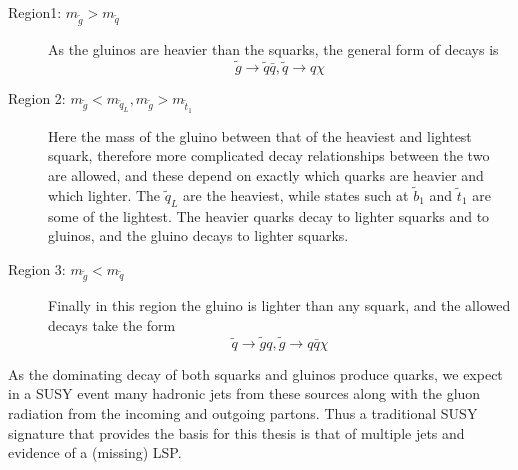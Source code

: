 \begin{description}
\item[Region1: $m_{\tilde{g}} > m_{\tilde{q}}$]{As the gluinos are heavier than the squarks, the general form of decays is
\begin{equation}
\tilde{g} \rightarrow \tilde{q} \bar{q} , \tilde{q} \rightarrow q \chi
\end{equation}
}
\item[Region 2: $m_{\tilde{g}}< m_{\tilde{q}_{L}}, m_{\tilde{g}}> m_{\tilde{t}_{1}} $]{Here the mass of the gluino between that of the heaviest and lightest squark, therefore more complicated decay relationships between the two are allowed, and these depend on exactly which quarks are heavier and which lighter. The $\tilde{q}_{L}$ are the heaviest, while states such at $\tilde{b}_{1}$ and $\tilde{t}_{1}$ are some of the lightest. The heavier quarks decay to lighter squarks and to gluinos, and the gluino decays to lighter squarks. }
\item[Region 3: $m_{\tilde{g}} < m_{\tilde{q}}$]{Finally in this region the gluino is lighter than any squark, and the allowed decays take the form
\begin{equation}
\tilde{q} \rightarrow \tilde{g}q , \tilde{g} \rightarrow q\bar{q} \chi
\end{equation}
}
\end{description}

As the dominating decay of both squarks and gluinos produce quarks, we expect in a SUSY event many hadronic jets from these sources along with the gluon radiation from the incoming and outgoing partons. Thus a traditional SUSY signature that provides the basis for this thesis is that of multiple jets and evidence of a (missing) LSP. 



